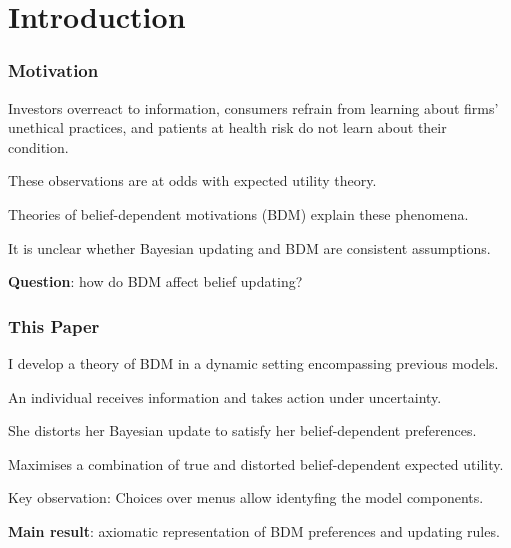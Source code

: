 \documentclass[usenames,dvipsnames,aspectratio=169,11pt, envcountsect]{beamer}
\begin{document}
\section{Introduction}

\begin{frame}
	\maketitle

\end{frame}

\begin{frame}\frametitle{Motivation}

	Investors overreact to information, consumers refrain from learning about firms' unethical practices, and patients at health risk do not learn about their condition.

	\vfill

	These observations are at odds with expected utility theory.

	\vfill

	Theories of belief-dependent motivations (BDM) explain these phenomena.

	\vfill \pause

	It is unclear whether Bayesian updating and BDM are consistent assumptions.

	\vfill

	\textbf{Question}: how do BDM affect belief updating?

\end{frame}

\begin{frame}\frametitle{This Paper}

	I develop a theory of BDM in a dynamic setting encompassing previous models.

	\vfill

	An individual receives information and takes action under uncertainty.

	\vfill

	She distorts her Bayesian update to satisfy her belief-dependent preferences.

	\vfill

	Maximises a combination of true and distorted belief-dependent expected utility.

	\vfill \pause

	Key observation: Choices over menus allow identyfing the model components.

	\vfill

	\textbf{Main result}: axiomatic representation of BDM preferences and updating rules.

\end{frame}
\end{document}
